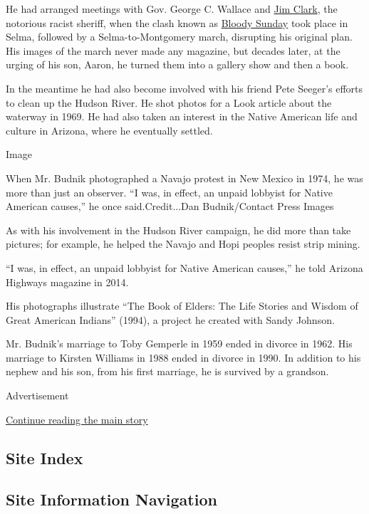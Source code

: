 He had arranged meetings with Gov. George C. Wallace and
\href{https://www.nytimes3xbfgragh.onion/2007/06/07/us/07clark.html}{Jim
Clark}, the notorious racist sheriff, when the clash known as
\href{https://www.history.com/news/selma-bloody-sunday-attack-civil-rights-movement}{Bloody
Sunday} took place in Selma, followed by a Selma-to-Montgomery march,
disrupting his original plan. His images of the march never made any
magazine, but decades later, at the urging of his son, Aaron, he turned
them into a gallery show and then a book.

In the meantime he had also become involved with his friend Pete
Seeger's efforts to clean up the Hudson River. He shot photos for a Look
article about the waterway in 1969. He had also taken an interest in the
Native American life and culture in Arizona, where he eventually
settled.

Image

When Mr. Budnik photographed a Navajo protest in New Mexico in 1974, he
was more than just an observer. ``I was, in effect, an unpaid lobbyist
for Native American causes,'' he once said.Credit...Dan Budnik/Contact
Press Images

As with his involvement in the Hudson River campaign, he did more than
take pictures; for example, he helped the Navajo and Hopi peoples resist
strip mining.

``I was, in effect, an unpaid lobbyist for Native American causes,'' he
told Arizona Highways magazine in 2014.

His photographs illustrate ``The Book of Elders: The Life Stories and
Wisdom of Great American Indians'' (1994), a project he created with
Sandy Johnson.

Mr. Budnik's marriage to Toby Gemperle in 1959 ended in divorce in 1962.
His marriage to Kirsten Williams in 1988 ended in divorce in 1990. In
addition to his nephew and his son, from his first marriage, he is
survived by a grandson.

Advertisement

\protect\hyperlink{after-bottom}{Continue reading the main story}

\hypertarget{site-index}{%
\subsection{Site Index}\label{site-index}}

\hypertarget{site-information-navigation}{%
\subsection{Site Information
Navigation}\label{site-information-navigation}}

